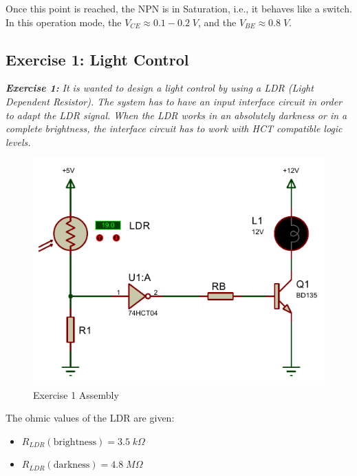 Once this point is reached, the NPN is in Saturation, i.e., it behaves like a switch. In this operation mode, the $V_{CE} \approx 0.1-0.2 \; V$, and the $V_{BE} \approx 0.8 \; V$.

\subsection{Exercise 1: Light Control}

\textit{\textbf{Exercise 1:}} \textit{It is wanted to design a light control by using a LDR (Light Dependent Resistor). The system has to have an input interface circuit in order to adapt the LDR signal. When the LDR works in an absolutely darkness or in a complete brightness, the interface circuit has to work with HCT compatible logic levels.}

\begin{figure}[H]
    \centering
    \includegraphics[scale = 0.9]{Graphics/Practice 8/EXERCISE_1/EX_1.PDF}
    \caption{Exercise 1 Assembly}
    \label{fig:EX_1}
\end{figure} \medskip

The ohmic values of the LDR are given:

\begin{itemize}
    \item $R_{LDR} \left( \text{brightness} \right) = 3.5 \; k\Omega$
    \item $R_{LDR} \left( \text{darkness} \right) = 4.8 \; M\Omega$
\end{itemize}

\clearpage

